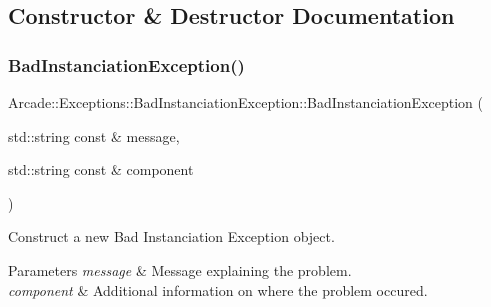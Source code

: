 \subsection{Constructor \& Destructor Documentation}
\mbox{\label{classArcade_1_1Exceptions_1_1BadInstanciationException_af23ea9690c2d1ebf5b90bdb30561dd3b}} 
\subsubsection{\texorpdfstring{BadInstanciationException()}{BadInstanciationException()}}
{\footnotesize\ttfamily Arcade\+::\+Exceptions\+::\+Bad\+Instanciation\+Exception\+::\+Bad\+Instanciation\+Exception (\begin{DoxyParamCaption}\item[{std\+::string const \&}]{message,  }\item[{std\+::string const \&}]{component }\end{DoxyParamCaption})}



Construct a new Bad Instanciation Exception object. 


\begin{DoxyParams}{Parameters}
{\em message} & Message explaining the problem. \\
\hline
{\em component} & Additional information on where the problem occured. \\
\hline
\end{DoxyParams}
